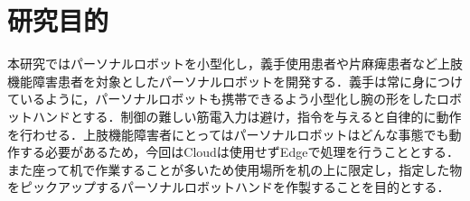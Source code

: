 \section{研究目的}

本研究ではパーソナルロボットを小型化し，義手使用患者や片麻痺患者など上肢機能障害患者を対象としたパーソナルロボットを開発する．義手は常に身につけているように，パーソナルロボットも携帯できるよう小型化し腕の形をしたロボットハンドとする．制御の難しい筋電入力は避け，指令を与えると自律的に動作を行わせる．上肢機能障害者にとってはパーソナルロボットはどんな事態でも動作する必要があるため，今回はCloudは使用せずEdgeで処理を行うこととする．また座って机で作業することが多いため使用場所を机の上に限定し，指定した物をピックアップするパーソナルロボットハンドを作製することを目的とする．




